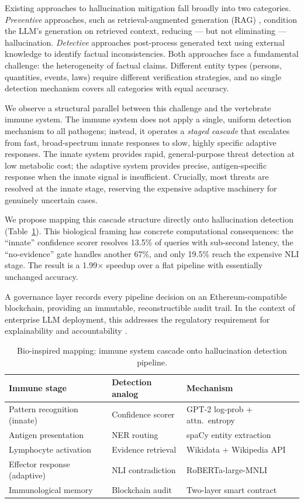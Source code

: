 \documentclass[11pt,a4paper]{article}
\begin{document}
Existing approaches to hallucination mitigation fall broadly into two
categories. \emph{Preventive} approaches, such as retrieval-augmented
generation (RAG) \citep{lewis2020rag}, condition the LLM's generation on
retrieved context, reducing --- but not eliminating --- hallucination.
\emph{Detective} approaches post-process generated text using external knowledge
to identify factual inconsistencies. Both approaches face a fundamental
challenge: the heterogeneity of factual claims. Different entity types (persons,
quantities, events, laws) require different verification strategies, and no
single detection mechanism covers all categories with equal accuracy.

We observe a structural parallel between this challenge and the vertebrate
immune system. The immune system does not apply a single, uniform detection
mechanism to all pathogens; instead, it operates a \emph{staged cascade} that
escalates from fast, broad-spectrum innate responses to slow, highly specific
adaptive responses. The innate system provides rapid, general-purpose threat
detection at low metabolic cost; the adaptive system provides precise,
antigen-specific response when the innate signal is insufficient. Crucially,
most threats are resolved at the innate stage, reserving the expensive adaptive
machinery for genuinely uncertain cases.

We propose mapping this cascade structure directly onto hallucination detection
(Table~\ref{tab:immuneanalogy}). This biological framing has concrete
computational consequences: the ``innate'' confidence scorer resolves 13.5\% of
queries with sub-second latency, the ``no-evidence'' gate handles another 67\%,
and only 19.5\% reach the expensive NLI stage. The result is a 1.99$\times$
speedup over a flat pipeline with essentially unchanged accuracy.

A governance layer records every pipeline decision on an Ethereum-compatible
blockchain, providing an immutable, reconstructible audit trail. In the context
of enterprise LLM deployment, this addresses the regulatory requirement for
explainability and accountability \citep{doshivelez2017rigorous}.

\begin{table}[htb]
\centering
\caption{Bio-inspired mapping: immune system cascade onto hallucination
detection pipeline.}
\label{tab:immuneanalogy}
\small
\begin{tabular}{lll}
\toprule
\textbf{Immune stage} & \textbf{Detection analog} & \textbf{Mechanism} \\
\midrule
Pattern recognition (innate) & Confidence scorer & GPT-2 log-prob + attn.\ entropy \\
Antigen presentation & NER routing & spaCy entity extraction \\
Lymphocyte activation & Evidence retrieval & Wikidata + Wikipedia API \\
Effector response (adaptive) & NLI contradiction & RoBERTa-large-MNLI \\
Immunological memory & Blockchain audit & Two-layer smart contract \\
\bottomrule
\end{tabular}
\end{table}
\end{document}
